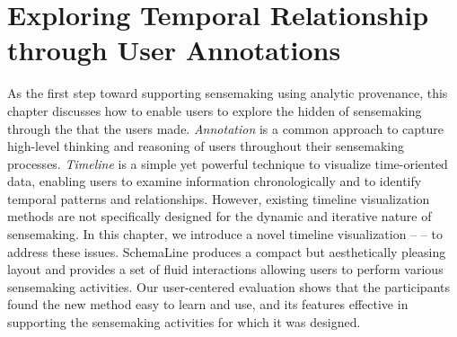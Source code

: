 \chapter{Exploring Temporal Relationship through User Annotations}
\label{chap:schemaline}

\graphicspath{{Chapter3/figures/}}

As the first step toward supporting sensemaking using analytic provenance, this chapter discusses how to enable users to explore the hidden  of sensemaking through the  that the users made. \emph{Annotation} is a common approach to capture high-level thinking and reasoning of users throughout their sensemaking processes. \emph{Timeline} is a simple yet powerful technique to visualize time-oriented data, enabling users to examine information chronologically and to identify temporal patterns and relationships. However, existing timeline visualization methods are not specifically designed for the dynamic and iterative nature of sensemaking. In this chapter, we introduce a novel timeline visualization -- \emph{} -- to address these issues. SchemaLine produces a compact but aesthetically pleasing layout and provides a set of fluid interactions allowing users to perform various sensemaking activities. Our user-centered evaluation shows that the participants found the new method easy to learn and use, and its features effective in supporting the sensemaking activities for which it was designed.






